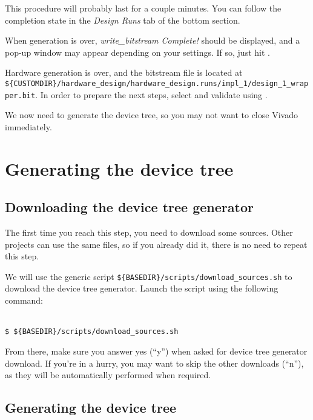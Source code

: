 \documentclass[openany,a4paper]{book}
\begin{document}
This procedure will probably last for a couple minutes.
You can follow the completion state in the \textit{Design Runs} tab of the bottom section.

When generation is over, \textit{write\_bitstream Complete!} should be displayed, and a pop-up window may appear depending on your settings.
If so, just hit .

Hardware generation is over, and the bitstream file is located at \nolinkurl{${CUSTOMDIR}/hardware_design/hardware_design.runs/impl_1/design_1_wrapper.bit}.
In order to prepare the next steps, select  and validate using .

We now need to generate the device tree, so you may not want to close Vivado immediately.

\section{Generating the device tree}

\subsection{Downloading the device tree generator}

The first time you reach this step, you need to download some sources.
Other projects can use the same files, so if you already did it, there is no need to repeat this step.

We will use the generic script \nolinkurl{${BASEDIR}/scripts/download_sources.sh} to download the device tree generator.
Launch the script using the following command:

\begin{tabbing}
\kill \hspace{1cm} \= \\
\> \texttt{\$ \$\{BASEDIR\}/scripts/download\_sources.sh}\\
\end{tabbing}

From there, make sure you answer yes (``y'') when asked for device tree generator download.
If you're in a hurry, you may want to skip the other downloads (``n''), as they will be automatically performed when required.


\subsection{Generating the device tree}\label{section_device_tree}
\end{document}

